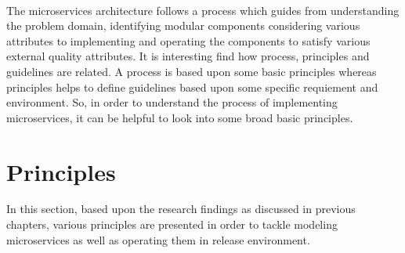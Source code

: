 \\
The microservices architecture follows a process which guides from understanding the problem domain, identifying modular components considering various attributes to implementing and operating the components to satisfy various external quality attributes. It is interesting find how process, principles and guidelines are related. A process is based upon some basic principles whereas principles helps to define guidelines based upon some specific requiement and environment. So, in order to understand the process of implementing microservices, it can be helpful to look into some broad basic principles.

\section{Principles}\label{section:guidelines/principles}
In this section, based upon the research findings as discussed in previous chapters, various principles are presented in order to tackle modeling microservices as well as operating them in release environment. \cite{Newman:2015aa}
